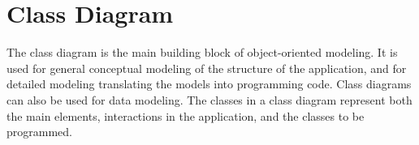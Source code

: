 \newpage
\section{Class Diagram}
The class diagram is the main building block of object-oriented
modeling. It is used for general conceptual modeling of the
structure of the application, and for detailed modeling translating
the models into programming code. Class diagrams can also be used for
data modeling. The classes in a class diagram represent both the
main elements, interactions in the application, and the classes to be
programmed.

\ifslides
\newpage
